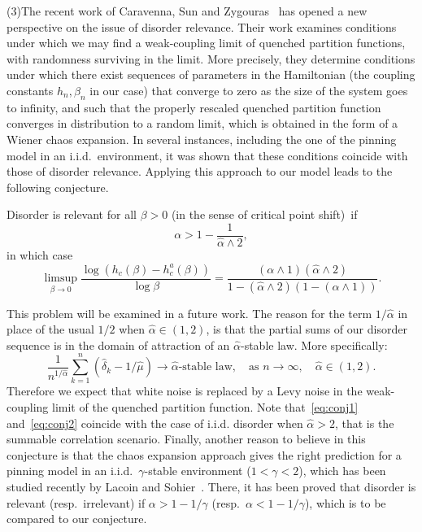 \documentclass[AHL,Unicode,longabstracts]{cedram}
\newcommand{\ga}{\alpha}
\newcommand{\gb}{\beta}
\newcommand{\gd}{\delta}
\newcommand{\ha}{\hat\ga}
\newcommand{\hmu}{\hat \mu}
\begin{document}
\medskip
\noindent (3)\enskip The recent work of Caravenna, Sun and Zygouras~\cite{CSZ16+} has opened a new perspective on the issue of disorder relevance. Their work examines conditions under which we may find a weak-coupling limit of quenched partition functions, with randomness surviving in the limit. More precisely, they determine conditions under which there exist sequences of parameters in the Hamiltonian (the coupling constants $h_n, \gb_n$ in our case) that converge to zero as the size of the system goes to infinity, and such that the properly rescaled quenched partition function converges in distribution to a random limit, which is obtained in the form of a Wiener chaos expansion. In several instances, including the one of the pinning model in an i.i.d.~environment, it was shown that these conditions coincide with those of disorder relevance. Applying this approach to our model leads to the following conjecture.

\begin{conj}\label{ConjRelevance}
Disorder is relevant for all $\gb>0$ (in the sense of critical point shift)~if
\begin{equation}\label{eq:conj1}
\ga > 1 - \frac{1}{\ha \wedge 2},
\end{equation}
in which case
\begin{equation} \label{eq:conj2}
\limsup_{\gb \to 0} \frac{\log (h_c(\gb) - h_c^a(\gb))}{\log \gb} = \frac{(\ga\wedge 1)(\ha\wedge 2)}{1-(\ha\wedge 2)(1-(\ga\wedge 1))}.
\end{equation}
\end{conj}

This problem will be examined in a future work. The reason for the term $1/\ha$ in place of the usual $1/2$ when $\ha\in (1,2)$, is that the partial sums of our disorder sequence is in the domain of attraction of an $\ha$-stable law. More specifically:
\begin{equation}
\frac{1}{n^{1/\ha}} \sum_{k=1}^n (\hat \gd_k - 1/\hmu) \longrightarrow \ha\text{-stable law},\quad \text{as\ } n\to\infty,\quad \ha\in(1,2).
\end{equation}
Therefore we expect that white noise is replaced by a Levy noise in the weak-coupling limit of the quenched partition function. Note that~\eqref{eq:conj1} and~\eqref{eq:conj2} coincide with the case of i.i.d. disorder when $\ha>2$, that is the summable correlation scenario. Finally, another reason to believe in this conjecture is that the chaos expansion approach gives the right prediction for a pinning model in an i.i.d.~$\gamma$-stable environment ($1 < \gamma < 2$), which has been studied recently by Lacoin and Sohier~\cite{LS16+}. There, it has been proved that disorder is relevant (resp.~irrelevant) if $\ga > 1 - 1/\gamma$ (resp.~$\ga < 1 - 1/\gamma$), which is to be compared to our conjecture.
\end{document}
